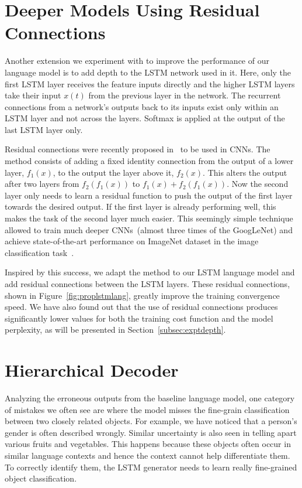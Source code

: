 \section{Deeper Models Using Residual Connections }
Another extension we experiment with to improve the performance of our language
model is to add depth to the LSTM network used in it.
Here, only the first LSTM layer receives the feature inputs directly and the
higher LSTM layers take their input $x(t)$ from the previous layer in the
network.
The recurrent connections from a network's outputs back to its inputs exist only
within an LSTM layer and not across the layers.
Softmax is applied at the output of the last LSTM layer only.

Residual connections were recently proposed in~\cite{He2015} to be used in CNNs.
The method consists of adding a fixed identity connection from the output of a
lower layer, $f_1(x)$, to the output the layer above it, $f_2(x)$.
This alters the output after two layers from $f_2(f_1(x))$ to $f_1(x)+f_2(f_1(x))$.
Now the second layer only needs to learn a residual function to push the
output of the first layer towards the desired output.
If the first layer is already performing well, this makes the task of the second
layer much easier.
This seemingly simple technique allowed to train much deeper CNNs~(almost three
times of the GoogLeNet) and achieve state-of-the-art performance on ImageNet
dataset in the image classification task~\cite{He2015}.

Inspired by this success, we adapt the method to our LSTM language model and
add residual connections between the LSTM layers. 
These residual connections, shown in Figure~\ref{fig:proplstmlang}, greatly
improve the training convergence speed.
We have also found out that the use of residual connections produces
significantly lower values for both the training cost function and the model
perplexity, as will be presented in Section~\ref{subsec:exptdepth}.

\section{Hierarchical Decoder}
\label{sec:ClassFact}
Analyzing the erroneous outputs from the baseline language model, one category of
mistakes we often see are where the model misses the fine-grain
classification between two closely related objects.
For example, we have noticed that a person's gender is often described wrongly.
Similar uncertainty is also seen in telling apart various fruits and vegetables.
This happens because these objects often occur in similar language contexts and
hence the context cannot help differentiate them.
To correctly identify them, the LSTM generator needs to learn really fine-grained
object classification.


